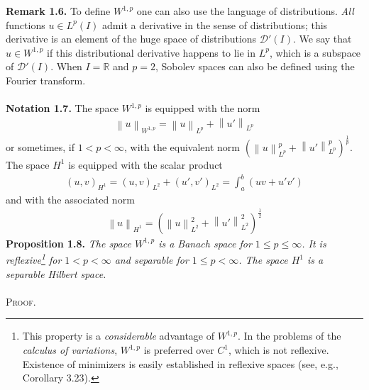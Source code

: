 \documentclass[a4paper,oneside]{book}
\numberwithin{equation}{chapter}
\begin{document}
\textbf{Remark 1.6.} To define $W^{1,p}$ one can also use the language of distributions. \textit{All} functions $u \in {L^p}\left( I \right)$ admit a derivative in the sense of distributions; this derivative is an element of the huge space of distributions $\mathcal{D}'\left(I\right)$. We say that $u \in {W^{1,p}}$ if this distributional derivative happens to lie in $L^p$, which is a subspace of $\mathcal{D}'\left(I\right)$. When $I=\mathbb{R}$ and $p=2$, Sobolev spaces can also be defined using the Fourier transform.\\
\\
\textbf{Notation 1.7.} The space $W^{1,p}$ is equipped with the norm
\begin{align}
{\left\| u \right\|_{{W^{1,p}}}} = {\left\| u \right\|_{{L^p}}} + {\left\| {u'} \right\|_{{L^p}}}
\end{align}
or sometimes, if $1<p<\infty$, with the equivalent norm ${\left( {\left\| u \right\|_{{L^p}}^p + \left\| {u'} \right\|_{{L^p}}^p} \right)^{\frac{1}{p}}}$. The space $H^1$ is equipped with the scalar product
\begin{align}
{\left( {u,v} \right)_{{H^1}}} = {\left( {u,v} \right)_{{L^2}}} + {\left( {u',v'} \right)_{{L^2}}} = \int_a^b {\left( {uv + u'v'} \right)} 
\end{align}
and with the associated norm
\begin{align}
{\left\| u \right\|_{{H^1}}} = {\left( {\left\| u \right\|_{{L^2}}^2 + \left\| {u'} \right\|_{{L^2}}^2} \right)^{\frac{1}{2}}}
\end{align}
\textbf{Proposition 1.8.} \textit{The space $W^{1,p}$ is a Banach space for $1\le p\le \infty$. It is reflexive\footnote{This property is a \textit{considerable} advantage of $W^{1,p}$. In the problems of the \textit{calculus of variations}, $W^{1,p}$ is preferred over $C^1$, which is not reflexive. Existence of minimizers is easily established in reflexive spaces (see, e.g., Corollary 3.23).} for $1<p<\infty$ and separable for $1\le p <\infty$. The space $H^1$ is a separable Hilbert space.}\\
\\
\textsc{Proof.} 
\end{document}
